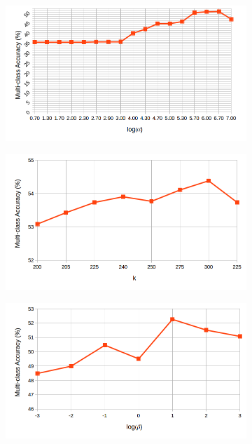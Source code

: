 \begin{figure}[!h]
\begin{subfigure}[b]{0.3\linewidth}
    \caption{}
  \end{subfigure}
    \begin{subfigure}[b]{0.3\linewidth}
    \includegraphics[width=\linewidth]{images/simple_gamma_birds}
    \caption{}
  \end{subfigure}
  \begin{subfigure}[b]{0.3\linewidth}
    \includegraphics[width=\linewidth]{images/simple_k_birds}
    \caption{}
  \end{subfigure}
    \begin{subfigure}[b]{0.3\linewidth}
    \includegraphics[width=\linewidth]{images/simple_beta_birds}

\end{subfigure}
\end{figure}
